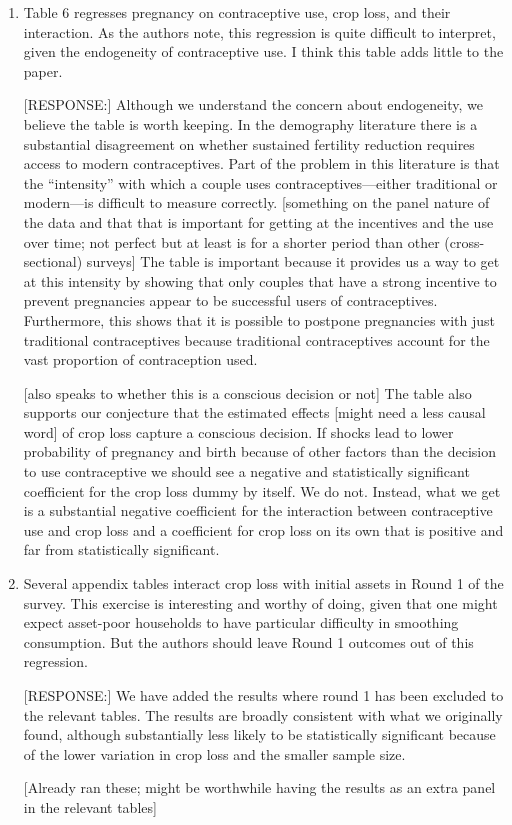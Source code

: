 \documentclass[letterpaper,12pt]{article}
\begin{document}
\begin{enumerate}
\item Table 6 regresses pregnancy on contraceptive use, crop loss, and
their interaction. As the authors note, this regression is quite
difficult to interpret, given the endogeneity of contraceptive use. I
think this table adds little to the paper.

[RESPONSE:] Although we understand the concern about endogeneity, 
we believe the table is worth keeping. 
In the demography literature there is a substantial disagreement on whether
sustained fertility reduction requires access to modern contraceptives.
Part of the problem in this literature is that the ``intensity'' with
which a couple uses contraceptives---either traditional or modern---is
difficult to measure correctly.
[something on the panel nature of the data and that that is important
for getting at the incentives and the use over time; not perfect but
at least is for a shorter period than other (cross-sectional) surveys]
The table is important because it provides us a way to get at this
intensity by showing that only couples that have a strong incentive to
prevent pregnancies appear to be successful users of contraceptives.
Furthermore, this shows that it is possible to postpone pregnancies with
just traditional contraceptives because traditional contraceptives account 
for the vast proportion of contraception used.

[also speaks to whether this is a conscious decision or not] 
The table also supports our conjecture that the estimated effects 
[might need a less causal word] 
of crop loss capture a conscious decision. 
If shocks lead to lower probability of pregnancy and birth because
of other factors than the decision to use contraceptive we should see
a negative and statistically significant coefficient for the crop loss
dummy by itself.
We do not.
Instead, what we get is a substantial negative coefficient for the interaction
between contraceptive use and crop loss and a coefficient for crop loss 
on its own that is positive and far from statistically significant.


\item Several appendix tables interact crop loss with initial assets in
Round 1 of the survey. This exercise is interesting and worthy of doing,
given that one might expect asset-poor households to have particular
difficulty in smoothing consumption. But the authors should leave Round
1 outcomes out of this regression.

[RESPONSE:] We have added the results where round 1 has been excluded
to the relevant tables.
The results are broadly consistent with what we originally found, 
although substantially less likely to be statistically significant 
because of the lower variation in crop loss and the smaller sample
size.

[Already ran these; might be worthwhile having the results as an extra
panel in the relevant tables]


\end{enumerate}
\end{document}
